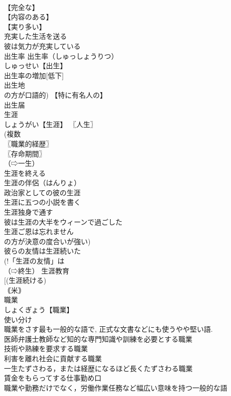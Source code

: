 \documentclass[8pt]{extreport}
\begin{document}
\begin{CJK}{UTF8}{min}
\\	【完全な】
\\	【内容のある】
\\	【実り多い】
\\	充実した生活を送る 
\\	彼は気力が充実している 
\\	出生率		出生率（しゅっしょうりつ） 
\\	しゅっせい【出生】 
\\	出生率の増加[低下] 
\\	出生地 
\\	の方が口語的) 【特に有名人の】
\\	出生届 
\\	生涯		
\\	しょうがい【生涯】 〖人生〗
\\	(複数 
\\	〖職業的経歴〗
\\	〖存命期間〗
\\	（⇨一生） 
\\	生涯を終える 
\\	生涯の伴侶（はんりょ） 
\\	政治家としての彼の生涯 
\\	生涯に五つの小説を書く 
\\	生涯独身で通す 
\\	彼は生涯の大半をウィーンで過ごした 
\\	生涯ご恩は忘れません 
\\	の方が決意の度合いが強い) 
\\	彼らの友情は生涯続いた 
\\	(!「生涯の友情」は 
\\	（⇨終生） 生涯教育 
\\	[(生涯続ける) 
\\	｟米｠ 
\\	職業		
\\	しょくぎょう【職業】 
\\	使い分け 
\\	職業をさす最も一般的な語で, 正式な文書などにも使うやや堅い語. 
\\	医師弁護士教師など知的な専門知識や訓練を必要とする職業
\\	技術や熟練を要求する職業
\\	利害を離れ社会に貢献する職業
\\	一生たずさわる，または経歴になるほど長くたずさわる職業
\\	賃金をもらってする仕事勤め口
\\	職業や勤務だけでなく，労働作業任務など幅広い意味を持つ一般的な語

\end{CJK}
\end{document}
